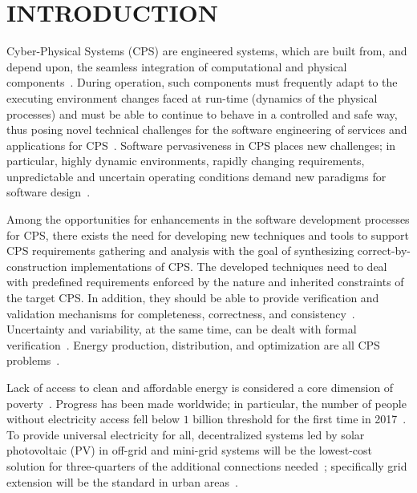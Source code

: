\documentclass[10pt,conference]{IEEEtran}
\begin{document}
\section{INTRODUCTION}
Cyber-Physical Systems  (CPS) are engineered systems, which are built from, and depend upon, 
the seamless integration of computational  and  physical  components~\cite{NSF2015}. 
During operation, such components must frequently adapt to the executing environment changes 
faced at run-time (dynamics of the physical processes) and must be able to continue to behave 
in a controlled and safe way, thus posing novel technical challenges for the software engineering of services and applications for CPS~\cite{Metzger2014}. %
Software pervasiveness in CPS places new challenges; in particular, highly dynamic environments, rapidly changing requirements, 
unpredictable and uncertain operating conditions demand new paradigms for software design~\cite{Filieri2015}.

Among the opportunities for enhancements in the software development processes for CPS, there exists the need for developing new techniques and tools to support CPS requirements gathering and analysis with the goal of synthesizing correct-by-construction implementations of CPS. The developed techniques need to deal with predefined requirements enforced by the nature and inherited constraints of the target CPS. In addition, they should be able to provide verification and validation mechanisms for completeness, correctness, and consistency~\cite{Al-Jaroodi2016}. Uncertainty and variability, at the same time, can be dealt with formal verification~\cite{NESSI}. Energy production, distribution, and optimization are all CPS problems~\cite{UC}. 

Lack of access to clean and affordable energy is considered a core dimension of poverty~\cite{Hussein2012}. Progress has been made worldwide; in particular, the number of people without electricity access fell below $1$ billion threshold for the first time in 2017~\cite{IEAweo2018}. To provide universal electricity for all, decentralized systems led by solar photovoltaic (PV) in off-grid and mini-grid systems will be the lowest-cost solution for three-quarters of the additional connections needed~\cite{Hussein2012}; specifically grid extension will be the standard in urban areas~\cite{IEAweo2018}.
\end{document}
